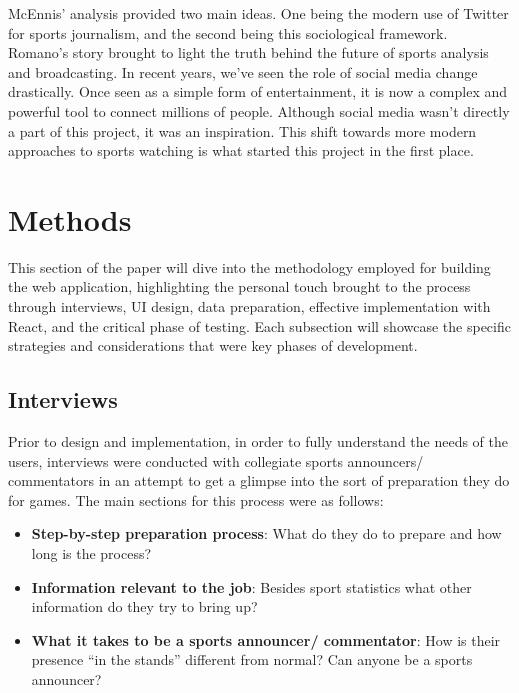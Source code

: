 \documentclass[10pt,twocolumn]{article}
\begin{document}
McEnnis' analysis provided two main ideas. One being the modern use of Twitter for sports journalism, and the second being this sociological framework. Romano’s story brought to light the truth behind the future of sports analysis and broadcasting. In recent years, we’ve seen the role of social media change drastically. Once seen as a simple form of entertainment, it is now a complex and powerful tool to connect millions of people. Although social media wasn't directly a part of this project, it was an inspiration. This shift towards more modern approaches to sports watching is what started this project in the first place.

\section{Methods}

This section of the paper will dive into the methodology employed for building the web application, highlighting the personal touch brought to the process through interviews, UI design, data preparation, effective implementation with React, and the critical phase of testing. Each subsection will showcase the specific strategies and considerations that were key phases of development.

\subsection{Interviews}

Prior to design and implementation, in order to fully understand the needs of the users, interviews were conducted with collegiate sports announcers/ commentators in an attempt to get a glimpse into the sort of preparation they do for games. \break\break
The main sections for this process were as follows:

\begin{itemize}
    \item \textbf{Step-by-step preparation process}: What do they do to prepare and how long is the process?
    \item \textbf{Information relevant to the job}: Besides sport statistics what other information do they try to bring up? 
    \item \textbf{What it takes to be a sports announcer/ commentator}: How is their presence “in the stands” different from normal? Can anyone be a sports announcer?
\end{itemize}
\end{document}
